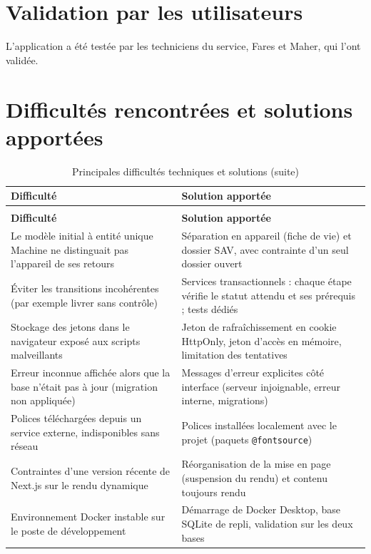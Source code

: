 \section{Validation par les utilisateurs}

L'application a été testée par les techniciens du service, Fares et Maher, qui l'ont validée.

\section{Difficultés rencontrées et solutions apportées}

{\small{}\renewcommand{\arraystretch}{1.3}
\begin{longtable}{|>{\raggedright\arraybackslash}p{6.85cm}|>{\raggedright\arraybackslash}p{7.76cm}|}
\caption{Principales difficultés techniques et solutions}\\
\hline
\rowcolor{ALbleu} \sffamily\bfseries\color{white} Difficulté & \sffamily\bfseries\color{white} Solution apportée \\ \hline
\endfirsthead
\caption[]{Principales difficultés techniques et solutions (suite)}\\
\hline
\rowcolor{ALbleu} \sffamily\bfseries\color{white} Difficulté & \sffamily\bfseries\color{white} Solution apportée \\ \hline
\endhead
Le modèle initial à entité unique \og{}Machine\fg{} ne distinguait pas l'appareil de ses retours & Séparation en appareil (fiche de vie) et dossier SAV, avec contrainte d'un seul dossier ouvert \\ \hline
\rowcolor{ALgris} Éviter les transitions incohérentes (par exemple livrer sans contrôle) & Services transactionnels : chaque étape vérifie le statut attendu et ses prérequis ; tests dédiés \\ \hline
Stockage des jetons dans le navigateur exposé aux scripts malveillants & Jeton de rafraîchissement en cookie HttpOnly, jeton d'accès en mémoire, limitation des tentatives \\ \hline
\rowcolor{ALgris} Erreur \og{}inconnue\fg{} affichée alors que la base n'était pas à jour (migration non appliquée) & Messages d'erreur explicites côté interface (serveur injoignable, erreur interne, migrations) \\ \hline
Polices téléchargées depuis un service externe, indisponibles sans réseau & Polices installées localement avec le projet (paquets \texttt{@fontsource}) \\ \hline
\rowcolor{ALgris} Contraintes d'une version récente de Next.js sur le rendu dynamique & Réorganisation de la mise en page (suspension du rendu) et contenu toujours rendu \\ \hline
Environnement Docker instable sur le poste de développement & Démarrage de Docker Desktop, base SQLite de repli, validation sur les deux bases \\ \hline
\end{longtable}
}

